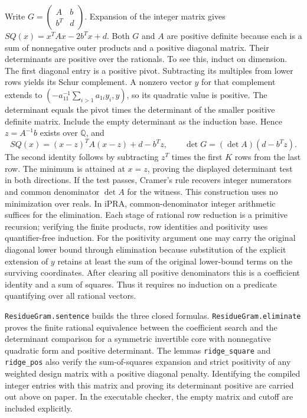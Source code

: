 Write $G=\left(\begin{smallmatrix}A&b\\ b^T&d\end{smallmatrix}\right)$.
Expansion of the integer matrix gives
$S Q(x)=x^TAx-2b^Tx+d$.
Both $G$ and $A$ are positive definite because each is a sum of nonnegative
outer products and a positive diagonal matrix. Their determinants are
positive over the rationals. To see this, induct on dimension. The first diagonal entry is a positive pivot. Subtracting
its multiples from lower rows yields its Schur complement. A nonzero
vector $y$ for that complement extends to
$(-a_{11}^{-1}\sum_{i>1}a_{1i}y_i,y)$, so its quadratic value is
positive. The determinant equals the pivot times the determinant of
the smaller positive definite matrix. Include the empty determinant
as the induction base. Hence $z=A^{-1}b$ exists over $\mathbb Q$, and
\[
 S Q(x)=(x-z)^TA(x-z)+d-b^Tz,\qquad
 \det G=(\det A)(d-b^T z).
\]
The second identity follows by subtracting $z^T$ times the first
$K$ rows from the last row. The minimum is attained at $x=z$, proving
the displayed determinant test in both directions. If the test passes,
Cramer's rule recovers integer numerators and common denominator
$\det A$ for the witness. This construction uses no minimization over
reals. In iPRA, common-denominator integer arithmetic suffices for the
elimination. Each stage of rational row reduction is a primitive
recursion; verifying the finite products, row identities and positivity
uses quantifier-free induction. For the positivity argument one may
carry the original diagonal lower bound through elimination because substitution of the explicit extension of $y$ retains at least the
sum of the original lower-bound terms on the surviving coordinates.
After clearing all positive denominators this is a coefficient identity
and a sum of squares. Thus it requires no induction on a predicate
quantifying over all rational vectors.

\texttt{ResidueGram.sentence} builds the three closed formulas.
\texttt{ResidueGram.eliminate} proves the finite rational equivalence
between the coefficient search and the determinant comparison for a
symmetric invertible core with nonnegative quadratic form and positive
determinant. The lemmas \texttt{ridge\_square} and \texttt{ridge\_pos}
also verify the sum-of-squares expansion and strict positivity of any
weighted design matrix with a positive diagonal penalty. Identifying the
compiled integer entries with this matrix and proving its determinant
positive are carried out above on paper. In the executable checker, the empty matrix and
cutoff are included explicitly.
